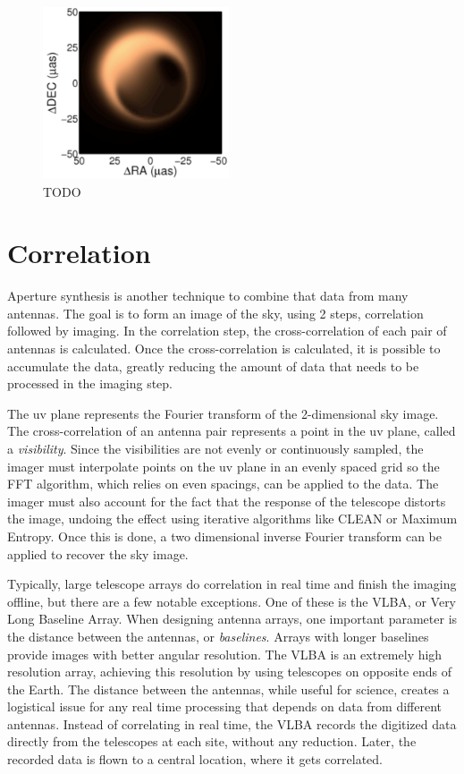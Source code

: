 \begin{figure}
  \centering
    \includegraphics[width=0.49\textwidth]{Images/C2/eht.pdf}
  \caption{TODO}
  \label{fig: C2/eht.pdf}
\end{figure}

\section{Correlation}
\label{Real Time Radio Astronomy Algorithms:Correlation}
Aperture synthesis is another technique to combine that data from many antennas.
The goal is to form an image of the sky, using 2 steps, correlation followed by imaging.
In the correlation step, the cross-correlation of each pair of antennas is calculated. 
Once the cross-correlation is calculated, it is possible to accumulate the data, greatly reducing the amount of data that needs to be processed in the imaging step.

The uv plane represents the Fourier transform of the 2-dimensional sky image. 
The cross-correlation of an antenna pair represents a point in the uv plane, called a \emph{visibility}. 
Since the visibilities are not evenly or continuously sampled, the imager must interpolate points on the uv plane in an evenly spaced grid so the FFT algorithm, which relies on even spacings, can be applied to the data. 
The imager must also account for the fact that the response of the telescope distorts the image, undoing the effect using iterative algorithms like CLEAN or Maximum Entropy. 
Once this is done, a two dimensional inverse Fourier transform can be applied to recover the sky image. 

Typically, large telescope arrays do correlation in real time and finish the imaging offline, but there are a few notable exceptions.
One of these is the VLBA, or Very Long Baseline Array. 
When designing antenna arrays, one important parameter is the distance between the antennas, or \emph{baselines}. 
Arrays with longer baselines provide images with better angular resolution. 
The VLBA is an extremely high resolution array, achieving this resolution by using telescopes on opposite ends of the Earth. 
The distance between the antennas, while useful for science, creates a logistical issue for any real time processing that depends on data from different antennas. 
Instead of correlating in real time, the VLBA records the digitized data directly from the telescopes at each site, without any reduction.
Later, the recorded data is flown to a central location, where it gets correlated.

